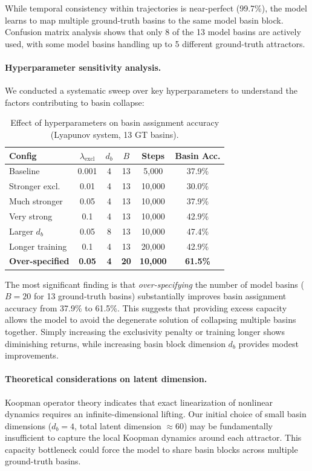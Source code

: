 While temporal consistency within trajectories is near-perfect (99.7\%), the model learns to map multiple ground-truth basins to the same model basin block. Confusion matrix analysis shows that only 8 of the 13 model basins are actively used, with some model basins handling up to 5 different ground-truth attractors.

\paragraph{Hyperparameter sensitivity analysis.}
We conducted a systematic sweep over key hyperparameters to understand the factors contributing to basin collapse:

\begin{table}[h]
\centering
\caption{Effect of hyperparameters on basin assignment accuracy (Lyapunov system, 13 GT basins).}
\label{tab:hyperparam-sweep}
\begin{tabular}{lccccc}
\toprule
\textbf{Config} & $\lambda_{\text{excl}}$ & $d_b$ & $B$ & \textbf{Steps} & \textbf{Basin Acc.} \\
\midrule
Baseline & 0.001 & 4 & 13 & 5,000 & 37.9\% \\
Stronger excl. & 0.01 & 4 & 13 & 10,000 & 30.0\% \\
Much stronger & 0.05 & 4 & 13 & 10,000 & 37.9\% \\
Very strong & 0.1 & 4 & 13 & 10,000 & 42.9\% \\
Larger $d_b$ & 0.05 & 8 & 13 & 10,000 & 47.4\% \\
Longer training & 0.1 & 4 & 13 & 20,000 & 42.9\% \\
\textbf{Over-specified} & \textbf{0.05} & \textbf{4} & \textbf{20} & \textbf{10,000} & \textbf{61.5\%} \\
\bottomrule
\end{tabular}
\end{table}

The most significant finding is that \emph{over-specifying} the number of model basins ($B = 20$ for 13 ground-truth basins) substantially improves basin assignment accuracy from 37.9\% to 61.5\%. This suggests that providing excess capacity allows the model to avoid the degenerate solution of collapsing multiple basins together. Simply increasing the exclusivity penalty or training longer shows diminishing returns, while increasing basin block dimension $d_b$ provides modest improvements.

\paragraph{Theoretical considerations on latent dimension.}
Koopman operator theory indicates that exact linearization of nonlinear dynamics requires an infinite-dimensional lifting. Our initial choice of small basin dimensions ($d_b = 4$, total latent dimension $\approx 60$) may be fundamentally insufficient to capture the local Koopman dynamics around each attractor. This capacity bottleneck could force the model to share basin blocks across multiple ground-truth basins.


